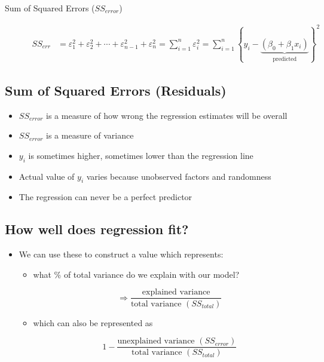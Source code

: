 \documentclass[10pt,article]{article}
\begin{document}
\begin{description}
\item[{Sum of Squared Errors (\(SS_{error}\))}] \quad

\iffalse
\[ \begin{aligned}
      SS_{err} &= \varepsilon^2_1 + \varepsilon^2_2 + \cdots +
                   \varepsilon^2_{n-1} + \varepsilon^2_{n} = \sum_{i=1}^n \varepsilon^2_i 
   \end{aligned} \]

\[ = \sum_{i=1}^n \left\{ y_i - \underbrace{(\beta_0 + \beta_1 x_{i})}_{\text{predicted}} \right\}^2 \]
\fi

\[ \begin{aligned}
      SS_{err} &= \varepsilon^2_1 + \varepsilon^2_2 + \cdots +
                   \varepsilon^2_{n-1} + \varepsilon^2_{n} = \sum_{i=1}^n \varepsilon^2_i 
      = \sum_{i=1}^n \left\{ y_i - \underbrace{(\beta_0 + \beta_1 x_{i})}_{\text{predicted}} \right\}^2
   \end{aligned} \]
\end{description}
\subsection{Sum of Squared Errors (Residuals)}
\label{sec:org11a2bca}
\begin{itemize}
\item \(SS_{error}\) is a measure of how wrong the regression estimates will be
overall
\item \(SS_{error}\) is a measure of variance
\item \(y_i\) is sometimes higher, sometimes lower than the regression line
\item Actual value of \(y_i\) varies because unobserved factors and randomness
\item The regression can never be a perfect predictor
\end{itemize}
\subsection{How well does regression fit?}
\label{sec:orgf6b6d7c}
\begin{itemize}
\item We can use these to construct a value which represents:

\begin{itemize}
\item what \% of total variance do we explain with our model?

\[ \Rightarrow \dfrac{\text{explained variance}}
       {\text{total variance } (SS_{total})}
    \]

\item which can also be represented as

\[
       1 - \dfrac{\text{unexplained variance } (SS_{error})}
       {\text{total variance } (SS_{total})}
    \]
\end{itemize}
\end{itemize}
\end{document}
